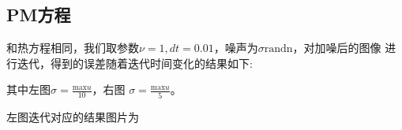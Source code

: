 \documentclass[a4paper,  11pt]{ctexart}
\begin{document}
\subsection{PM方程}
和热方程相同，我们取参数$\nu=1,dt=0.01$，噪声为$\sigma \text{randn}$，对加噪后的图像
进行迭代，得到的误差随着迭代时间变化的结果如下:
\begin{figure}[H]
    \centering
\end{figure}
其中左图$\sigma=\frac{\text{max}u}{10}$，右图
$\sigma=\frac{\text{max}u}{5}$。\par
左图迭代对应的结果图片为
\end{document}
